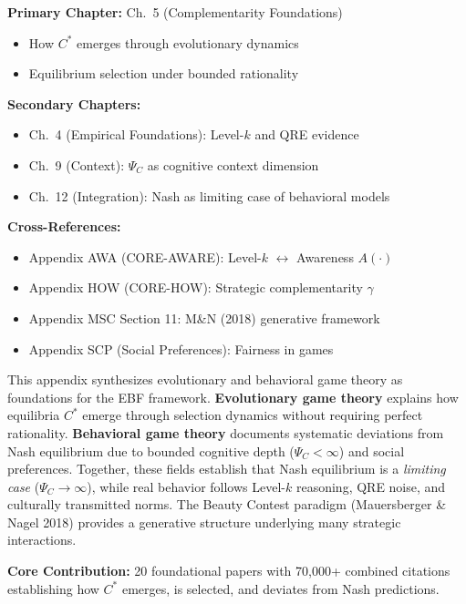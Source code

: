 \begin{tcolorbox}[colback=green!5!white, colframe=green!75!black,
    title=\textbf{Chapter References}]

\textbf{Primary Chapter:} Ch.\ 5 (Complementarity Foundations)
\begin{itemize}[nosep]
    \item How $C^*$ emerges through evolutionary dynamics
    \item Equilibrium selection under bounded rationality
\end{itemize}

\textbf{Secondary Chapters:}
\begin{itemize}[nosep]
    \item Ch.\ 4 (Empirical Foundations): Level-$k$ and QRE evidence
    \item Ch.\ 9 (Context): $\Psi_C$ as cognitive context dimension
    \item Ch.\ 12 (Integration): Nash as limiting case of behavioral models
\end{itemize}

\textbf{Cross-References:}
\begin{itemize}[nosep]
    \item Appendix AWA (CORE-AWARE): Level-$k$ $\leftrightarrow$ Awareness $A(\cdot)$
    \item Appendix HOW (CORE-HOW): Strategic complementarity $\gamma$
    \item Appendix MSC Section 11: M\&N (2018) generative framework
    \item Appendix SCP (Social Preferences): Fairness in games
\end{itemize}

\end{tcolorbox}

\begin{tcolorbox}[colback=blue!5!white, colframe=blue!75!black,
    title=\textbf{Abstract}]

This appendix synthesizes evolutionary and behavioral game theory as foundations
for the EBF framework. \textbf{Evolutionary game theory} explains how equilibria
$C^*$ emerge through selection dynamics without requiring perfect rationality.
\textbf{Behavioral game theory} documents systematic deviations from Nash equilibrium
due to bounded cognitive depth ($\Psi_C < \infty$) and social preferences.
Together, these fields establish that Nash equilibrium is a \textit{limiting case}
($\Psi_C \to \infty$), while real behavior follows Level-$k$ reasoning,
QRE noise, and culturally transmitted norms. The Beauty Contest paradigm
(Mauersberger \& Nagel 2018) provides a generative structure underlying
many strategic interactions.

\textbf{Core Contribution:} 20 foundational papers with 70,000+ combined citations
establishing how $C^*$ emerges, is selected, and deviates from Nash predictions.

\end{tcolorbox}

